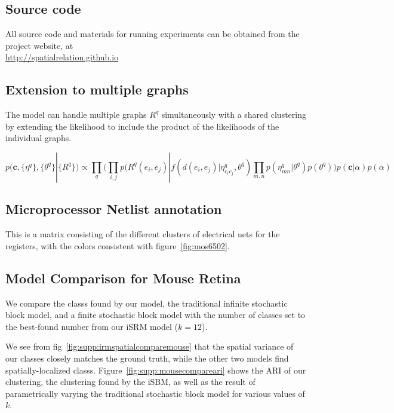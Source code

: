 \documentclass{article}
\renewcommand{\vec}[1]{\mathbf{#1}}
\begin{document}
\subsection{Source code}

All source code and materials for running experiments can be
obtained from the project website, at \\

\href{http://spatialrelation.github.io }{http://spatialrelation.github.io}


\subsection{Extension to multiple graphs}
\label{supp:multigraph}
The model can handle multiple graphs $R^q$ simultaneously with a shared clustering by extending the likelihood to include the product of the likelihoods of the individual graphs. 

\begin{equation}
  p(\vec{c}, \{\eta^q\}, \{\theta^q\} | \{R^q\} ) \propto \prod_q \Bigg(\prod_{i, j} p(R^q(e_i, e_j) | f(d(e_i, e_j) | \eta^q_{c_ic_j}, \theta^q) \prod_{m, n} p(\eta^q_{mn} | \theta^q)  p(\theta^q) \Bigg) p(\vec{c} | \alpha) p(\alpha) 
\end{equation}

\FloatBarrier

\subsection{Microprocessor Netlist annotation}
\label{supp:mos6502netlist}
This is a matrix consisting of the different clusters of electrical nets for 
the registers, with the colors consistent with figure~\ref{fig:mos6502}. 



\FloatBarrier
\subsection{Model Comparison for Mouse Retina}

We compare the classs found by our model, the traditional infinite
stochastic block model, and a finite stochastic block model with the number
of classes set to the best-found number from our iSRM model ($k=12$).

We see from fig~\ref{fig:supp:irmspatialcomparemouse} that the spatial
variance of our classes closely matches the ground truth, while the
other two models find spatially-localized
classs. Figure~\ref{fig:supp:mousecompareari} shows the ARI of our
clustering, the clustering found by the iSBM,
as well as the result of parametrically varying the traditional stochastic
block model for various values of $k$. 
\end{document}
